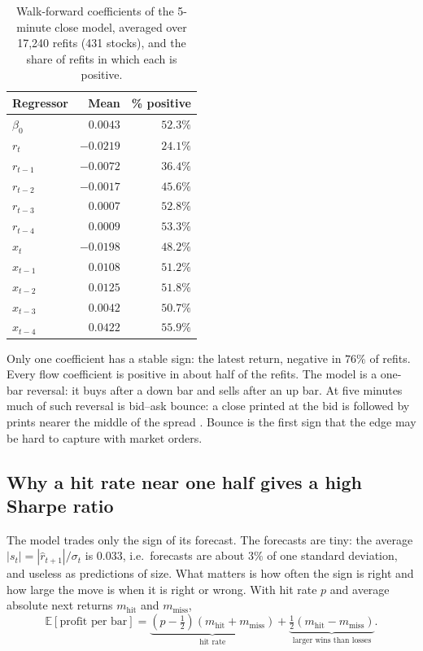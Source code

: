 \documentclass[11pt,a4paper]{article}
\newcommand{\E}{\mathbb{E}}
\begin{document}
\begin{table}[htbp]
\centering
\caption{Walk-forward coefficients of the 5-minute close model, averaged over 17{,}240 refits
(431 stocks), and the share of refits in which each is positive.}
\label{tab:coef}
\small
\begin{tabular}{@{}lrr@{}}
\toprule
Regressor & Mean & \% positive \\
\midrule
$\beta_0$ & $0.0043$ & $52.3\%$ \\
$r_t$ & $-0.0219$ & $24.1\%$ \\
$r_{t-1}$ & $-0.0072$ & $36.4\%$ \\
$r_{t-2}$ & $-0.0017$ & $45.6\%$ \\
$r_{t-3}$ & $0.0007$ & $52.8\%$ \\
$r_{t-4}$ & $0.0009$ & $53.3\%$ \\
$x_t$ & $-0.0198$ & $48.2\%$ \\
$x_{t-1}$ & $0.0108$ & $51.2\%$ \\
$x_{t-2}$ & $0.0125$ & $51.8\%$ \\
$x_{t-3}$ & $0.0042$ & $50.7\%$ \\
$x_{t-4}$ & $0.0422$ & $55.9\%$ \\
\bottomrule
\end{tabular}
\end{table}

Only one coefficient has a stable sign: the latest return, negative in $76\%$ of refits. Every
flow coefficient is positive in about half of the refits. The model is a one-bar reversal: it buys after a
down bar and sells after an up bar. At five minutes much of such reversal is bid--ask bounce: a close
printed at the bid is followed by prints nearer the middle of the spread \citep{roll1984}. Bounce is the first sign that the edge may be hard to capture with market orders.

\subsection{Why a hit rate near one half gives a high Sharpe ratio}
\label{sec:why}

The model trades only the sign of its forecast. The forecasts are tiny: the average $|s_t|=|\hat r_{t+1}|/\sigma_t$ is $0.033$, i.e.\ forecasts are about
$3\%$ of one standard deviation, and useless as predictions of size. What matters is how often the sign is right and how
large the move is when it is right or wrong. With hit rate $p$ and average absolute next returns
$m_{\text{hit}}$ and $m_{\text{miss}}$,
\[
\E[\text{profit per bar}] = \underbrace{(p-\tfrac12)(m_{\text{hit}}+m_{\text{miss}})}_{\text{hit rate}}
+ \underbrace{\tfrac12(m_{\text{hit}}-m_{\text{miss}})}_{\text{larger wins than losses}}.
\]
\end{document}

